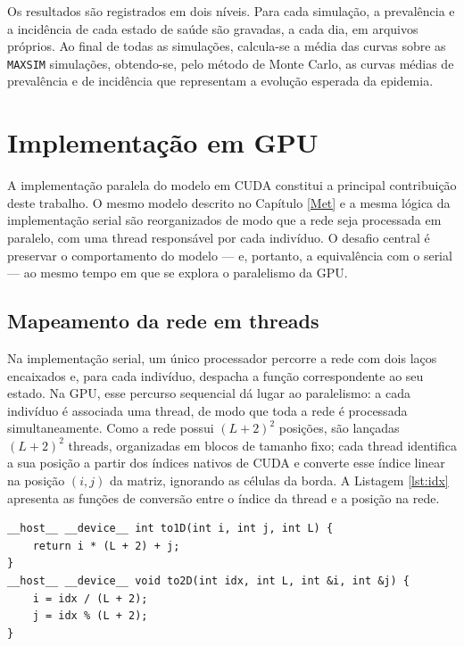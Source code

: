 \documentclass[
	12pt,				%
	openright,			%
	oneside,			%
	a4paper,			%
	english,			%
	french,				%
	spanish,			%
	brazil				%
	]{abntex2}
\begin{document}
Os resultados são registrados em dois níveis. Para cada simulação, a prevalência e a incidência de cada estado de saúde são gravadas, a cada dia, em arquivos próprios. Ao final de todas as simulações, calcula-se a média das curvas sobre as \texttt{MAXSIM} simulações, obtendo-se, pelo método de Monte Carlo, as curvas médias de prevalência e de incidência que representam a evolução esperada da epidemia.

\chapter{Implementação em GPU}
\label{cap:gpu}

A implementação paralela do modelo em CUDA constitui a principal contribuição deste trabalho. O mesmo modelo descrito no Capítulo \ref{Met} e a mesma lógica da implementação serial são reorganizados de modo que a rede seja processada em paralelo, com uma thread responsável por cada indivíduo. O desafio central é preservar o comportamento do modelo --- e, portanto, a equivalência com o serial --- ao mesmo tempo em que se explora o paralelismo da GPU.

\section{Mapeamento da rede em threads}

Na implementação serial, um único processador percorre a rede com dois laços encaixados e, para cada indivíduo, despacha a função correspondente ao seu estado. Na GPU, esse percurso sequencial dá lugar ao paralelismo: a cada indivíduo é associada uma thread, de modo que toda a rede é processada simultaneamente. Como a rede possui $(L+2)^2$ posições, são lançadas $(L+2)^2$ threads, organizadas em blocos de tamanho fixo; cada thread identifica a sua posição a partir dos índices nativos de CUDA e converte esse índice linear na posição $(i, j)$ da matriz, ignorando as células da borda. A Listagem \ref{lst:idx} apresenta as funções de conversão entre o índice da thread e a posição na rede.

\begin{lstlisting}[caption={Conversão entre o índice da thread e a posição na rede.}, label={lst:idx}]
__host__ __device__ int to1D(int i, int j, int L) {
    return i * (L + 2) + j;
}
__host__ __device__ void to2D(int idx, int L, int &i, int &j) {
    i = idx / (L + 2);
    j = idx % (L + 2);
}
\end{lstlisting}
\end{document}
